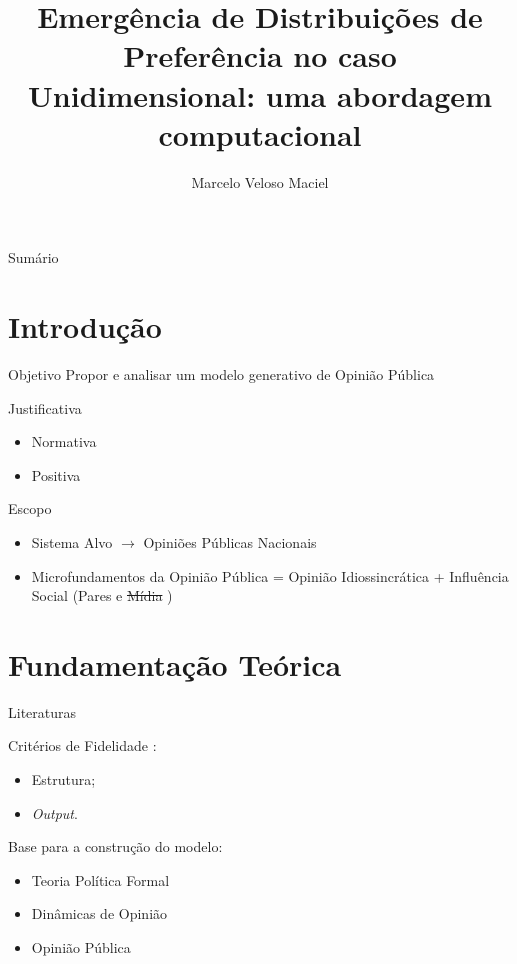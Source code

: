 \documentclass{beamer}
\title{Emergência de Distribuições de Preferência no caso Unidimensional: uma
  abordagem computacional}
\date{}
\author{Marcelo Veloso Maciel}
\institute{}
\begin{document}
\maketitle



\begin{frame}{Sumário}
\tableofcontents
\end{frame}



\section{Introdução}
\begin{frame}{Objetivo}
  Propor e analisar um modelo generativo de Opinião Pública
\end{frame}


\begin{frame}{Justificativa}
  \begin{itemize}
  \item Normativa
  \item Positiva
  \end{itemize}
\end{frame}

\begin{frame}{Escopo}
  \begin{itemize}
  \item Sistema Alvo \(\rightarrow\) Opiniões Públicas Nacionais
  \item Microfundamentos da Opinião Pública = Opinião Idiossincrática +
    Influência Social (Pares e \st{Mídia} )
  \end{itemize}
  
\end{frame}

\section{Fundamentação Teórica}
\begin{frame}{Literaturas}

Critérios de Fidelidade \cite{weisberg2012simulation}:
\begin{itemize}
\item Estrutura;
\item \textit{Output}.
\end{itemize}
  
Base para a construção do modelo:

\begin{itemize}
\item Teoria Política Formal
\item Dinâmicas de Opinião
\item \textcolor{gray!70}{Opinião Pública}
\end{itemize}
\end{frame}
\end{document}
